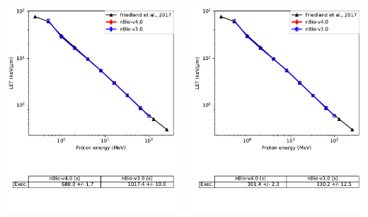 \documentclass[aspectratio=1610]{beamer}
\begin{document}
\begin{frame}{\secname}
  \begin{columns}
    \begin{column}{0.4\linewidth}
     \includegraphics[width=\textwidth]{./LET/LET_g4em-dna_opt4}
    \end{column}
    \begin{column}{0.4\linewidth} 
     \includegraphics[width=\textwidth]{./LET/LET_g4em-dna_opt6}

\end{column}
\end{columns}
\end{frame}
\end{document}
